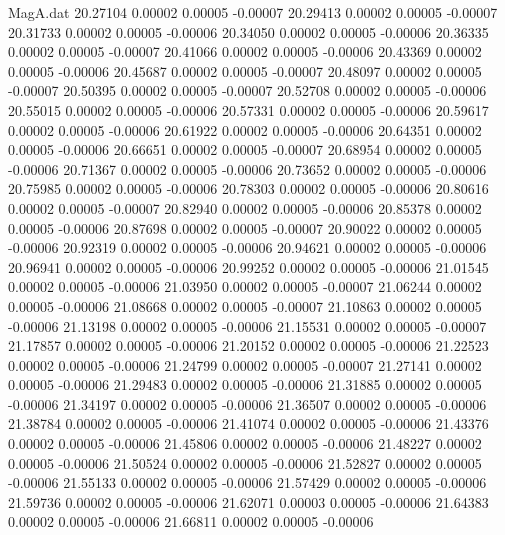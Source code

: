 \begin{filecontents}{MagA.dat}
  20.27104    0.00002    0.00005   -0.00007
  20.29413    0.00002    0.00005   -0.00007
  20.31733    0.00002    0.00005   -0.00006
  20.34050    0.00002    0.00005   -0.00006
  20.36335    0.00002    0.00005   -0.00007
  20.41066    0.00002    0.00005   -0.00006
  20.43369    0.00002    0.00005   -0.00006
  20.45687    0.00002    0.00005   -0.00007
  20.48097    0.00002    0.00005   -0.00007
  20.50395    0.00002    0.00005   -0.00007
  20.52708    0.00002    0.00005   -0.00006
  20.55015    0.00002    0.00005   -0.00006
  20.57331    0.00002    0.00005   -0.00006
  20.59617    0.00002    0.00005   -0.00006
  20.61922    0.00002    0.00005   -0.00006
  20.64351    0.00002    0.00005   -0.00006
  20.66651    0.00002    0.00005   -0.00007
  20.68954    0.00002    0.00005   -0.00006
  20.71367    0.00002    0.00005   -0.00006
  20.73652    0.00002    0.00005   -0.00006
  20.75985    0.00002    0.00005   -0.00006
  20.78303    0.00002    0.00005   -0.00006
  20.80616    0.00002    0.00005   -0.00007
  20.82940    0.00002    0.00005   -0.00006
  20.85378    0.00002    0.00005   -0.00006
  20.87698    0.00002    0.00005   -0.00007
  20.90022    0.00002    0.00005   -0.00006
  20.92319    0.00002    0.00005   -0.00006
  20.94621    0.00002    0.00005   -0.00006
  20.96941    0.00002    0.00005   -0.00006
  20.99252    0.00002    0.00005   -0.00006
  21.01545    0.00002    0.00005   -0.00006
  21.03950    0.00002    0.00005   -0.00007
  21.06244    0.00002    0.00005   -0.00006
  21.08668    0.00002    0.00005   -0.00007
  21.10863    0.00002    0.00005   -0.00006
  21.13198    0.00002    0.00005   -0.00006
  21.15531    0.00002    0.00005   -0.00007
  21.17857    0.00002    0.00005   -0.00006
  21.20152    0.00002    0.00005   -0.00006
  21.22523    0.00002    0.00005   -0.00006
  21.24799    0.00002    0.00005   -0.00007
  21.27141    0.00002    0.00005   -0.00006
  21.29483    0.00002    0.00005   -0.00006
  21.31885    0.00002    0.00005   -0.00006
  21.34197    0.00002    0.00005   -0.00006
  21.36507    0.00002    0.00005   -0.00006
  21.38784    0.00002    0.00005   -0.00006
  21.41074    0.00002    0.00005   -0.00006
  21.43376    0.00002    0.00005   -0.00006
  21.45806    0.00002    0.00005   -0.00006
  21.48227    0.00002    0.00005   -0.00006
  21.50524    0.00002    0.00005   -0.00006
  21.52827    0.00002    0.00005   -0.00006
  21.55133    0.00002    0.00005   -0.00006
  21.57429    0.00002    0.00005   -0.00006
  21.59736    0.00002    0.00005   -0.00006
  21.62071    0.00003    0.00005   -0.00006
  21.64383    0.00002    0.00005   -0.00006
  21.66811    0.00002    0.00005   -0.00006

\end{filecontents}
